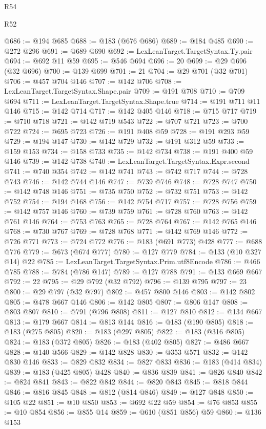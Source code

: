 \begin{lexlean}{R54}
\begin{lexlean}{R52}
\begin{coremodule}
{{{{{{{{{{{{{{{{{{{{{{{{{{{{{{{{{{{{{{{{{{{{{{{{{{{{{{{{{{{{{{{{{{{{{{{{{{{{{{{{{{{{{{{{{{{{{{{{{{{{{{{{{{{{{{{{{{{{{{{{{{{{{{{{{{{{{{{{{{{{{{{{{{{{{{{{{{{{{{{{{{{{{{{{{{{{{{{{{{{{{{{{{{{{{{{{{{{{{{@686 := @194 @685
@688 := @183 (@676 @686)
@689 := @184 @485
@690 := @272 @296
@691 := @689 @690
@692 := LexLeanTarget.TargetSyntax.Ty.pair
@694 := @692 @11 @59
@695 := @546 @694
@696 := 20
@699 := @29 @696 (@32 @696)
@700 := @139 @699
@701 := 21
@704 := @29 @701 (@32 @701)
@706 := @457 @704 @146
@707 := @142 @706
@708 := LexLeanTarget.TargetSyntax.Shape.pair
@709 := @191 @708
@710 := @709 @694
@711 := LexLeanTarget.TargetSyntax.Shape.true
@714 := @191 @711 @11 @146
@715 := @142 @714
@717 := @142 @405 @146
@718 := @715 @717
@719 := @710 @718
@721 := @142 @719 @543
@722 := @707 @721
@723 := @700 @722
@724 := @695 @723
@726 := @191 @408 @59
@728 := @191 @293 @59
@729 := @194 @147
@730 := @142 @729
@732 := @191 @312 @59
@733 := @159 @153
@734 := @158 @733
@735 := @142 @734
@738 := @191 @400 @59 @146
@739 := @142 @738
@740 := LexLeanTarget.TargetSyntax.Expr.second
@741 := @740 @354
@742 := @142 @741
@743 := @742 @717
@744 := @728 @743
@746 := @142 @744 @146
@747 := @739 @746
@748 := @728 @747
@750 := @142 @748 @146
@751 := @735 @750
@752 := @732 @751
@753 := @142 @752
@754 := @194 @168
@756 := @142 @754 @717
@757 := @728 @756
@759 := @142 @757 @146
@760 := @739 @759
@761 := @728 @760
@763 := @142 @761 @146
@764 := @753 @763
@765 := @728 @764
@767 := @142 @765 @146
@768 := @730 @767
@769 := @728 @768
@771 := @142 @769 @146
@772 := @726 @771
@773 := @724 @772
@776 := @183 (@691 @773) @428
@777 := @688 @776
@779 := @673 (@674 @777)
@780 := @127 @779
@784 := @133 (@10 @327 @14) @22
@785 := LexLeanTarget.TargetSyntax.Prim.utf8Encode
@786 := @466 @785
@788 := @784 (@786 @147)
@789 := @127 @788
@791 := @133 @669 @667
@792 := 22
@795 := @29 @792 (@32 @792)
@796 := @139 @795
@797 := 23
@800 := @29 @797 (@32 @797)
@802 := @457 @800 @146
@803 := @142 @802
@805 := @478 @667 @146
@806 := @142 @805
@807 := @806 @147
@808 := @803 @807
@810 := @791 (@796 @808)
@811 := @127 @810
@812 := @134 @667
@813 := @179 @667
@814 := @813 @144
@816 := @183 (@190 @805)
@818 := @183 (@275 @805)
@820 := @183 (@297 @805)
@822 := @183 (@316 @805)
@824 := @183 (@372 @805)
@826 := @183 (@402 @805)
@827 := @486 @667
@828 := @140 @566
@829 := @142 @828
@830 := @353 @571
@832 := @142 @830 @146
@833 := @829 @832
@834 := @827 @833
@836 := @183 (@414 @834)
@839 := @183 (@425 @805) @428
@840 := @836 @839
@841 := @826 @840
@842 := @824 @841
@843 := @822 @842
@844 := @820 @843
@845 := @818 @844
@846 := @816 @845
@848 := @812 (@814 @846)
@849 := @127 @848
@850 := @105 @22
@851 := @10 @850
@853 := @692 @22 @59
@854 := @76 @853
@855 := @10 @854
@856 := @855 @14
@859 := @610 (@851 @856) @59
@860 := @136 @153
}}}}}}}}}}}}}}}}}}}}}}}}}}}}}}}}}}}}}}}}}}}}}}}}}}}}}}}}}}}}}}}}}}}}}}}}}}}}}}}}}}}}}}}}}}}}}}}}}}}}}}}}}}}}}}}}}}}}}}}}}}}}}}}}}}}}}}}}}}}}}}}}}}}}}}}}}}}}}}}}}}}}}}}}}}}}}}}}}}}}}}}}}}}}}}}}}}}}}}
\end{coremodule}
\end{lexlean}
\end{lexlean}
